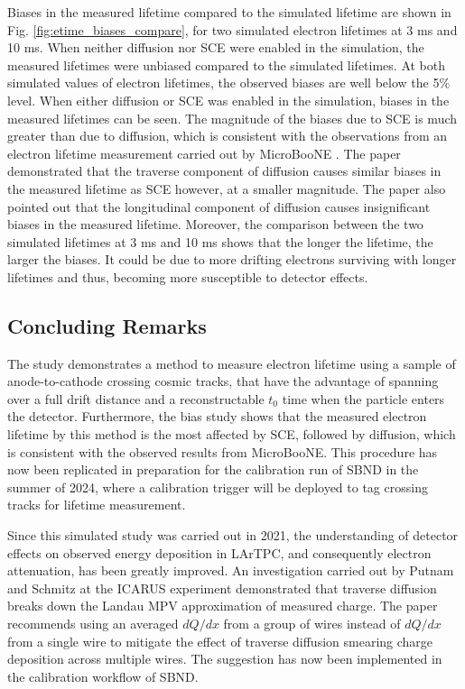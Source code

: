 Biases in the measured lifetime compared to the simulated lifetime are shown in Fig. \ref{fig:etime_biases_compare}, for two simulated electron lifetimes at 3 ms and 10 ms.
When neither diffusion nor SCE were enabled in the simulation, the measured lifetimes were unbiased compared to the simulated lifetimes.
At both simulated values of electron lifetimes, the observed biases are well below the 5\% level.
When either diffusion or SCE was enabled in the simulation, biases in the measured lifetimes can be seen.
The magnitude of the biases due to SCE is much greater than due to diffusion, which is consistent with the observations from an electron lifetime measurement carried out by MicroBooNE \cite{ubooneEtime}. 
The paper demonstrated that the traverse component of diffusion causes similar biases in the measured lifetime as SCE however, at a smaller magnitude.
The paper also pointed out that the longitudinal component of diffusion causes insignificant biases in the measured lifetime.
Moreover, the comparison between the two simulated lifetimes at 3 ms and 10 ms shows that the longer the lifetime, the larger the biases.
It could be due to more drifting electrons surviving with longer lifetimes and thus, becoming more susceptible to detector effects.

\subsection{Concluding Remarks}
\label{sec7:etime_remark}

The study demonstrates a method to measure electron lifetime using a sample of anode-to-cathode crossing cosmic tracks, that have the advantage of spanning over a full drift distance and a reconstructable $t_{0}$ time when the particle enters the detector.
Furthermore, the bias study shows that the measured electron lifetime by this method is the most affected by SCE, followed by diffusion, which is consistent with the observed results from MicroBooNE.
This procedure has now been replicated in preparation for the calibration run of SBND in the summer of 2024, where a calibration trigger will be deployed to tag crossing tracks for lifetime measurement.

Since this simulated study was carried out in 2021, the understanding of detector effects on observed energy deposition in LArTPC, and consequently electron attenuation, has been greatly improved.
An investigation carried out by Putnam and Schmitz at the ICARUS experiment demonstrated that traverse diffusion breaks down the Landau MPV approximation \cite{GrayDiffusion} of measured charge.
The paper recommends using an averaged $dQ/dx$ from a group of wires instead of $dQ/dx$ from a single wire to mitigate the effect of traverse diffusion smearing charge deposition across multiple wires.
The suggestion has now been implemented in the calibration workflow of SBND.

